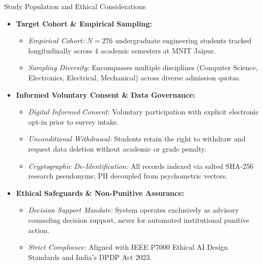 \documentclass{beamer}
\begin{document}
\begin{frame}[t]{Study Population and Ethical Considerations}
  \begin{itemize}\setlength{\itemsep}{6pt}\small
    \item \textbf{Target Cohort \& Empirical Sampling:}
    \begin{itemize}\setlength{\itemsep}{2pt}\footnotesize
      \item \textit{Empirical Cohort:} $N = 276$ undergraduate engineering students tracked longitudinally across 4 academic semesters at MNIT Jaipur.
      \item \textit{Sampling Diversity:} Encompasses multiple disciplines (Computer Science, Electronics, Electrical, Mechanical) across diverse admission quotas.
    \end{itemize}
    \item \textbf{Informed Voluntary Consent \& Data Governance:}
    \begin{itemize}\setlength{\itemsep}{2pt}\footnotesize
      \item \textit{Digital Informed Consent:} Voluntary participation with explicit electronic opt-in prior to survey intake.
      \item \textit{Unconditional Withdrawal:} Students retain the right to withdraw and request data deletion without academic or grade penalty.
      \item \textit{Cryptographic De-Identification:} All records indexed via salted SHA-256 research pseudonyms; PII decoupled from psychometric vectors.
    \end{itemize}
    \item \textbf{Ethical Safeguards \& Non-Punitive Assurance:}
    \begin{itemize}\setlength{\itemsep}{2pt}\footnotesize
      \item \textit{Decision Support Mandate:} System operates exclusively as advisory counseling decision support, never for automated institutional punitive action.
      \item \textit{Strict Compliance:} Aligned with IEEE P7000 Ethical AI Design Standards and India's DPDP Act 2023.
    \end{itemize}
  \end{itemize}
\end{frame}
\end{document}
